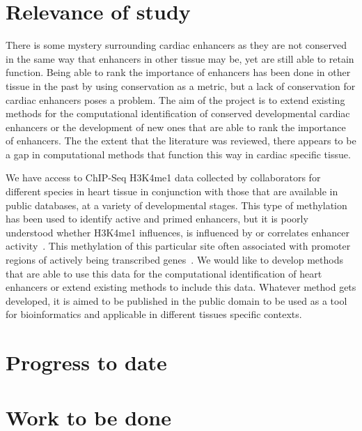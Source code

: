 \documentclass[12pt,a4paper]{article}
\begin{document}
    \section{Relevance of study}
        There is some mystery surrounding cardiac enhancers as they are not conserved in the same way that enhancers in other tissue may be, yet are still able to retain function. Being able to rank the importance of enhancers has been done in other tissue in the past by using conservation as a metric, but a lack of conservation for cardiac enhancers poses a problem.
        The aim of the project is to extend existing methods for the computational identification of conserved developmental cardiac enhancers or the development of new ones that are able to rank the importance of enhancers. The the extent that the literature was reviewed, there appears to be a gap in computational methods that function this way in cardiac specific tissue.
        
        We have access to ChIP-Seq H3K4me1 data collected by collaborators for different species in heart tissue in conjunction with those that are available in public databases, at a variety of developmental stages. This type of methylation has been used to identify active and primed enhancers, but it is poorly understood whether H3K4me1 influences, is influenced by or correlates enhancer activity~\cite{rada2018h3k4me1}. This methylation of this particular site often associated with promoter regions of actively being transcribed genes~\cite{barski2007high}. We would like to develop methods that are able to use this data for the computational identification of heart enhancers or extend existing methods to include this data. Whatever method gets developed, it is aimed to be published in the public domain to be used as a tool for bioinformatics and applicable in different tissues specific contexts.  
        
    \section{Progress to date}
    
    
    \section{Work to be done}
    
    
    

\end{document}
